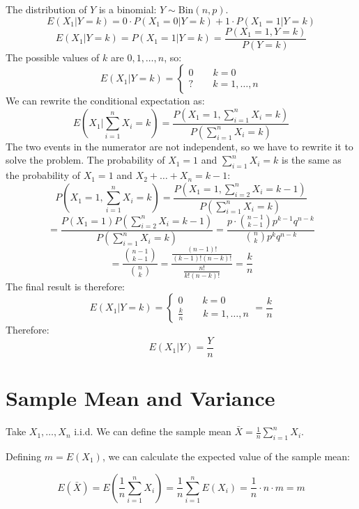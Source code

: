 
The distribution of $Y$ is a binomial: $Y \sim \text{Bin}(n, p)$.
\[
E(X_1 | Y = k) = 0 \cdot P(X_1 = 0 | Y = k) + 1 \cdot P(X_1 = 1 | Y = k)
\]
\[
E(X_1 | Y = k) = P(X_1 = 1 | Y = k) = \frac{P(X_1 = 1, Y = k)}{P(Y = k)}
\]
The possible values of $k$ are $0, 1, \ldots , n$, so:
\[
    E(X_1 | Y = k) = \begin{cases}
        0 \qquad k = 0 \\
        ? \qquad k = 1, \ldots , n
    \end{cases}
\]
We can rewrite the conditional expectation as:
\[
E\left(X_1 | \sum_{i=1}^{n} X_i = k\right) = \frac{P(X_1 = 1, \sum_{i=1}^{n} X_i = k)}{P(\sum_{i=1}^{n} X_i = k)}
\]
The two events in the numerator are not independent, so we have to rewrite it to solve the problem.
The probability of $X_1 = 1$ and $\sum_{i=1}^{n} X_i = k$ is the same as the probability of $X_1 = 1$ and $X_2 + \ldots + X_n = k-1$:
\[
P(X_1 = 1, \sum_{i=1}^{n} X_i = k) = \frac{P(X_1 = 1, \sum_{i=2}^{n} X_i = k-1)}{P(\sum_{i=1}^{n} X_i = k)}
\]
\[
= \frac{P(X_1 = 1)P(\sum_{i=2}^{n} X_i = k-1)}{P(\sum_{i=1}^{n} X_i = k)} = \frac{p\cdot \binom{n-1}{k-1}p^{k-1}q^{n-k}}{\binom{n}{k}p^kq^{n-k}}
\]
\[
= \frac{\binom{n-1}{k-1}}{\binom{n}{k}} = \frac{\frac{(n-1)!}{(k-1)!(n-k)!}}{\frac{n!}{k!(n-k)!}} = \frac{k}{n}
\]
The final result is therefore:
\[    
E(X_1 | Y = k) = \begin{cases}
    0 \qquad k = 0 \\
    \frac{k}{n} \qquad k = 1, \ldots , n
\end{cases}
= \frac{k}{n}
\]
Therefore:
\[
E(X_1 | Y) = \frac{Y}{n}
\]

\section{Sample Mean and Variance}

Take $X_1, \ldots , X_n$ i.i.d. We can define the sample mean $\bar{X} = \frac{1}{n} \sum_{i=1}^{n} X_i$.

Defining $m = E(X_1)$, we can calculate the expected value of the sample mean:

\[
E(\bar{X}) = E\left(\frac{1}{n} \sum_{i=1}^{n} X_i\right) = \frac{1}{n} \sum_{i=1}^{n} E(X_i) = \frac{1}{n} \cdot n \cdot m = m
\]


